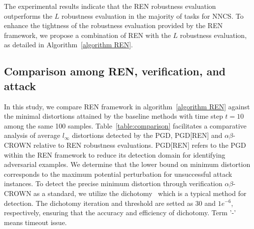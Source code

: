 \documentclass[conference]{IEEEtran}
\newcommand{\abcrown}{$\alpha\beta$-CROWN\xspace}
\newcommand{\ren}{\textsc{REN}\xspace}
\newcommand{\nncs}{\textsc{NNCS}\xspace}
\begin{document}
The experimental results indicate that the 
\ren robustness evaluation outperforms the $L$ 
robustness evaluation in the majority of 
tasks for \nncs. To enhance the tightness 
of the robustness evaluation provided 
by the \ren framework, we propose a combination 
of \ren with the $L$ robustness evaluation, 
as detailed in Algorithm~\ref{algorithm REN}.


\subsection{Comparison among \ren, verification, and attack }\label{exam:comparison}

In this study, we compare \ren framework 
in algorithm~\ref{algorithm REN}
against the minimal distortions attained 
by the baseline methods with time step $t = 10$ 
among the same 100 samples. 
Table~\ref{table:comparison} facilitates a 
comparative analysis of 
average $l_{\infty}$ distortions 
detected by the PGD, PGD[\ren] and \abcrown relative to 
\ren robustness evaluations. 
PGD[\ren] refers to the PGD within the 
\ren framework to reduce its detection 
domain for identifying adversarial examples. 
We determine that the lower 
bound on minimum distortion corresponds 
to the maximum potential perturbation 
for unsuccessful attack instances. 
To detect the precise minimum distortion 
through verification \abcrown as a standard, 
we utilize the dichotomy~\cite{jay1981gender} 
which is a typical method for detection. 
The dichotomy iteration and 
threshold are setted as $30$ and $1e^{-6}$, 
respectively, ensuring that 
the accuracy and efficiency of dichotomy. 
Term '-' means timeout issue. 
\end{document}
